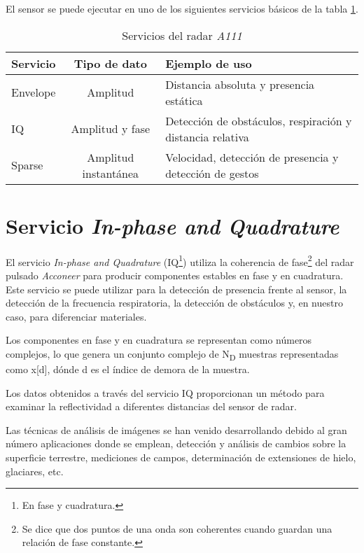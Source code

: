 El sensor se puede ejecutar en uno de los siguientes servicios básicos de la tabla \ref{tab:serviciosa111}.

\begin{table}[h]
\begin{center}
\begin{tabular}{| l | c | p{7cm} |}
\hline
\textbf{Servicio} & \textbf{Tipo de dato} & \textbf{Ejemplo de uso} \\ \hline
Envelope & Amplitud & Distancia absoluta y presencia estática \\ \hline
IQ & Amplitud y fase & Detección de obstáculos, respiración y distancia relativa \\ \hline
Sparse & Amplitud instantánea & Velocidad, detección de presencia y detección de gestos \\ \hline
\end{tabular}
\caption{Servicios del radar \textit{A111}}
\label{tab:serviciosa111}
\end{center}
\end{table}


\section{Servicio \textit{In-phase and Quadrature}}

El servicio \textit{In-phase and Quadrature} (IQ\footnote{En fase y cuadratura.}) utiliza la coherencia de fase\footnote{Se dice que dos puntos de una onda son coherentes cuando guardan una relación de fase constante.} del radar pulsado \textit{Acconeer} para producir componentes estables en fase y en cuadratura. Este servicio se puede utilizar para la detección de presencia frente al sensor, la detección de la frecuencia respiratoria, la detección de obstáculos y, en nuestro caso, para diferenciar materiales.

Los componentes en fase y en cuadratura se representan como números complejos, lo que genera un conjunto complejo de N\textsubscript{D} muestras representadas como x[d], dónde d es el índice de demora de la muestra.

Los datos obtenidos a través del servicio IQ proporcionan un método para examinar la reflectividad a diferentes distancias del sensor de radar.

Las técnicas de análisis de imágenes se han venido desarrollando debido al gran número aplicaciones donde se emplean, detección y análisis de cambios sobre la superficie terrestre, mediciones de campos, determinación de extensiones de hielo, glaciares, etc.


